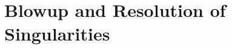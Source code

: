\documentclass[12pt, a4paper, oneside]{book}
\theoremstyle{plain}
\newtheorem{theorem}{Theorem}[chapter]
\theoremstyle{definition}
\theoremstyle{remark}
\theoremstyle{definition}
\begin{document}

\section{Blowup and Resolution of Singularities}
\label{sec:blowup}
\end{document}
